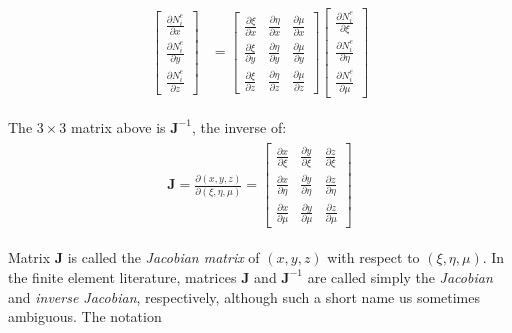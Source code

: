 \documentclass[10pt,b5paper,titlepage]{book}
\newcommand{\m}{\mathbf}
\newenvironment{eqarray}
{
    \begin{eqnarray}
        \begin{aligned}
}
{
        \end{aligned}
    \end{eqnarray}
}
\begin{document}
\begin{eqarray}
    \begin{bmatrix}
        \frac{\partial N_i^e}{\partial x}\\
        \frac{\partial N_i^e}{\partial y}\\
        \frac{\partial N_i^e}{\partial z}
    \end{bmatrix} &=
    \begin{bmatrix}
        \frac{\partial \xi}{\partial x} &
        \frac{\partial \eta}{\partial x} &
        \frac{\partial \mu}{\partial x}\\
        \frac{\partial \xi}{\partial y} &
        \frac{\partial \eta}{\partial y} &
        \frac{\partial \mu}{\partial y}\\
        \frac{\partial \xi}{\partial z} &
        \frac{\partial \eta}{\partial z} &
        \frac{\partial \mu}{\partial z}
    \end{bmatrix}
    \begin{bmatrix}
        \frac{\partial N_i^e}{\partial \xi}\\
        \frac{\partial N_i^e}{\partial \eta}\\
        \frac{\partial N_i^e}{\partial \mu}
    \end{bmatrix}
\end{eqarray}

The $ 3 \times 3 $ matrix above is $ \m{J}^{-1} $, the inverse of:
\begin{eqarray}
    \m{J} = \frac{\partial \left( x, y, z \right)}{\partial \left( \xi, \eta, \mu \right)}
    = \begin{bmatrix}
        \frac{\partial x}{\partial \xi} &
        \frac{\partial y}{\partial \xi} &
        \frac{\partial z}{\partial \xi} \\
        \frac{\partial x}{\partial \eta} &
        \frac{\partial y}{\partial \eta} &
        \frac{\partial z}{\partial \eta} \\
        \frac{\partial x}{\partial \mu} &
        \frac{\partial y}{\partial \mu} &
        \frac{\partial z}{\partial \mu}
    \end{bmatrix}
\end{eqarray}

Matrix $ \m{J} $ is called the \textit{Jacobian matrix} of $ (x, y, z) $
with respect to $ (\xi, \eta, \mu) $. In the finite element literature, matrices
$ \m{J} $ and $ \m{J}^{-1} $ are called simply the \textit{Jacobian} and
\textit{inverse Jacobian}, respectively, although such a short name us sometimes
ambiguous. The notation
\end{document}
